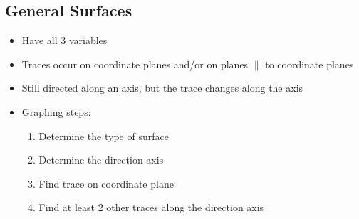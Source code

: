 \documentclass{article}
\begin{document}
\subsection{General Surfaces}
\begin{itemize}
  \item Have all 3 variables
  \item Traces occur on coordinate planes and/or on planes $\parallel$ to coordinate planes
  \item Still directed along an axis, but the trace changes along the axis
  \item Graphing steps:
  \begin{enumerate}
    \item Determine the type of surface
    \item Determine the direction axis
    \item Find trace on coordinate plane
    \item Find at least 2 other traces along the direction axis
  \end{enumerate}
\end{itemize}
\end{document}
